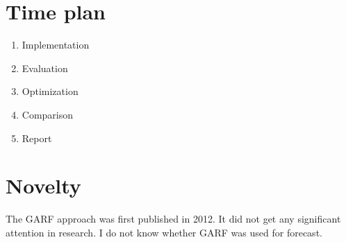 \documentclass{scrartcl}
\begin{document}
\section{Time plan}

\begin{enumerate}
\item Implementation
\item Evaluation
\item Optimization
\item Comparison
\item Report
\end{enumerate}

\section{Novelty}
The GARF approach was first published in 2012. It did not get any significant attention in research. I do not know whether GARF was used for forecast.






%







\end{document}

